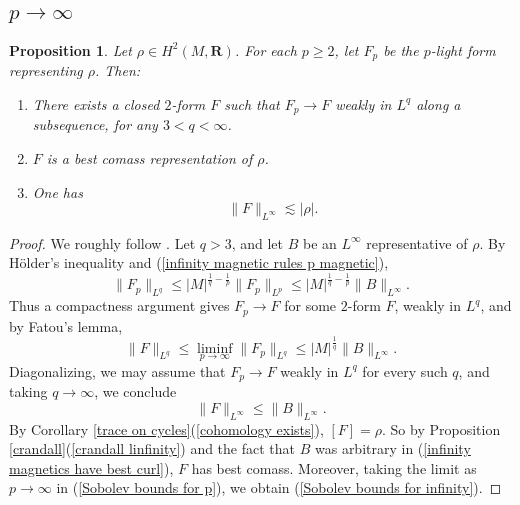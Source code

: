 \documentclass[reqno,11pt]{amsart}
\newcommand{\RR}{\mathbf{R}}
\newtheorem{proposition}[theorem]{Proposition}
\theoremstyle{definition}
\numberwithin{equation}{section}
\begin{document}
\subsection{\texorpdfstring{$p \to \infty$}{The limit as p goes to infinity}}
\begin{proposition}\label{existence infinity}
Let $\rho \in H^2(M, \RR)$.
For each $p \geq 2$, let $F_p$ be the $p$-light form representing $\rho$. Then:
\begin{enumerate}
\item There exists a closed $2$-form $F$ such that $F_p \to F$ weakly in $L^q$ along a subsequence, for any $3 < q < \infty$.
\item $F$ is a best comass representation of $\rho$.
\item One has 
\begin{equation}\label{Sobolev bounds for infinity}
	\|F\|_{L^\infty} \lesssim |\rho|.
\end{equation}
\end{enumerate}
\end{proposition}
\begin{proof}
We roughly follow \cite[\S3]{Lindqvist14}.
Let $q > 3$, and let $B$ be an $L^\infty$ representative of $\rho$.
By H\"older's inequality and (\ref{infinity magnetic rules p magnetic}),
\begin{equation}\label{uniform bounds in p by best curl}
	\|F_p\|_{L^q} \leq |M|^{\frac{1}{q} - \frac{1}{p}} \|F_p\|_{L^p} \leq |M|^{\frac{1}{q} - \frac{1}{p}} \|B\|_{L^\infty}.
\end{equation}
Thus a compactness argument gives $F_p \to F$ for some $2$-form $F$, weakly in $L^q$, and by Fatou's lemma, 
$$\|F\|_{L^q} \leq \liminf_{p \to \infty} \|F_p\|_{L^q} \leq |M|^{\frac{1}{q}} \|B\|_{L^\infty}.$$
Diagonalizing, we may assume that $F_p \to F$ weakly in $L^q$ for every such $q$, and taking $q \to \infty$, we conclude 
\begin{equation}\label{infinity magnetics have best curl}
	\|F\|_{L^\infty} \leq \|B\|_{L^\infty}.
\end{equation}
By Corollary \ref{trace on cycles}(\ref{cohomology exists}), $[F] = \rho$.
So by Proposition \ref{crandall}(\ref{crandall linfinity}) and the fact that $B$ was arbitrary in (\ref{infinity magnetics have best curl}), $F$ has best comass.
Moreover, taking the limit as $p \to \infty$ in (\ref{Sobolev bounds for p}), we obtain (\ref{Sobolev bounds for infinity}).
\end{proof}
\end{document}
